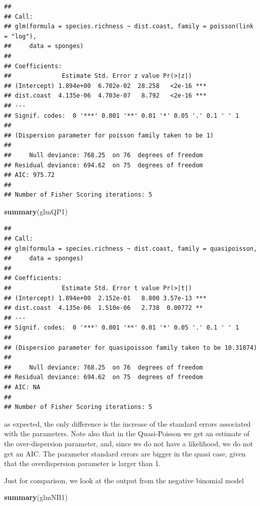 \documentclass[
]{book}
\newenvironment{Shaded}{\begin{snugshade}}{\end{snugshade}}
\newcommand{\FunctionTok}[1]{\textcolor[rgb]{0.13,0.29,0.53}{\textbf{#1}}}
\newcommand{\NormalTok}[1]{#1}
\begin{document}
\begin{verbatim}
## 
## Call:
## glm(formula = species.richness ~ dist.coast, family = poisson(link = "log"), 
##     data = sponges)
## 
## Coefficients:
##              Estimate Std. Error z value Pr(>|z|)    
## (Intercept) 1.894e+00  6.702e-02  28.258   <2e-16 ***
## dist.coast  4.135e-06  4.703e-07   8.792   <2e-16 ***
## ---
## Signif. codes:  0 '***' 0.001 '**' 0.01 '*' 0.05 '.' 0.1 ' ' 1
## 
## (Dispersion parameter for poisson family taken to be 1)
## 
##     Null deviance: 768.25  on 76  degrees of freedom
## Residual deviance: 694.62  on 75  degrees of freedom
## AIC: 975.72
## 
## Number of Fisher Scoring iterations: 5
\end{verbatim}

\begin{Shaded}
\begin{Highlighting}[]
\FunctionTok{summary}\NormalTok{(glmQP1)}
\end{Highlighting}
\end{Shaded}

\begin{verbatim}
## 
## Call:
## glm(formula = species.richness ~ dist.coast, family = quasipoisson, 
##     data = sponges)
## 
## Coefficients:
##              Estimate Std. Error t value Pr(>|t|)    
## (Intercept) 1.894e+00  2.152e-01   8.800 3.57e-13 ***
## dist.coast  4.135e-06  1.510e-06   2.738  0.00772 ** 
## ---
## Signif. codes:  0 '***' 0.001 '**' 0.01 '*' 0.05 '.' 0.1 ' ' 1
## 
## (Dispersion parameter for quasipoisson family taken to be 10.31074)
## 
##     Null deviance: 768.25  on 76  degrees of freedom
## Residual deviance: 694.62  on 75  degrees of freedom
## AIC: NA
## 
## Number of Fisher Scoring iterations: 5
\end{verbatim}

as expected, the only difference is the increase of the standard errors associated with the parameters. Note also that in the Quasi-Poisson we get an estimate of the over-dispersion parameter, and, since we do not have a likelihood, we do not get an AIC. The parameter standard errors are bigger in the quasi case, given that the overdispersion parameter is larger than 1.

Just for comparison, we look at the output from the negative binomial model

\begin{Shaded}
\begin{Highlighting}[]
\FunctionTok{summary}\NormalTok{(glmNB1)}
\end{Highlighting}
\end{Shaded}
\end{document}
